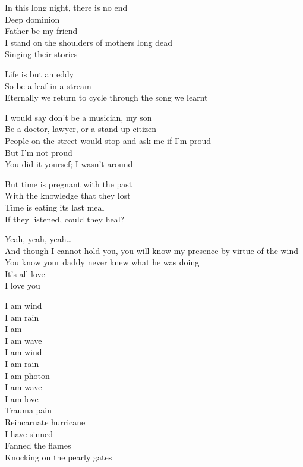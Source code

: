 
In this long night, there is no end\\
Deep dominion\\
Father be my friend\\
I stand on the shoulders of mothers long dead\\
Singing their stories\\


Life is but an eddy\\
So be a leaf in a stream\\
Eternally we return to cycle through the song we learnt\\


I would say don't be a musician, my son\\
Be a doctor, lawyer, or a stand up citizen\\
People on the street would stop and ask me if I'm proud\\
But I'm not proud\\
You did it yoursef; I wasn't around\\


But time is pregnant with the past\\
With the knowledge that they lost\\
Time is eating its last meal\\
If they listened, could they heal?\\


Yeah, yeah, yeah…\\
And though I cannot hold you, you will know my presence by virtue of the wind\\
You know your daddy never knew what he was doing\\
It's all love\\
I love you\\


I am wind\\
I am rain\\
I am \\
I am wave\\
I am wind\\
I am rain\\
I am photon\\
I am wave\\
I am love\\
Trauma pain\\
Reincarnate hurricane\\
I have sinned\\
Fanned the flames\\
Knocking on the pearly gates\\

